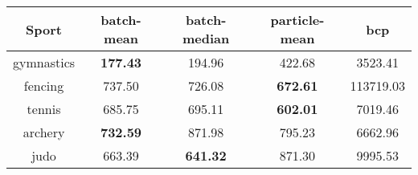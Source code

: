 \begin{tabular}{|c|c|c|c|c|}
\hline
Sport & batch-mean & batch-median & particle-mean & bcp \\
\hline
gymnastics & \textbf{177.43} & 194.96 & 422.68 & 3523.41 \\
fencing & 737.50 & 726.08 & \textbf{672.61} & 113719.03 \\
tennis & 685.75 & 695.11 & \textbf{602.01} & 7019.46 \\
archery & \textbf{732.59} & 871.98 & 795.23 & 6662.96 \\
judo & 663.39 & \textbf{641.32} & 871.30 & 9995.53 \\
\hline
\end{tabular}
